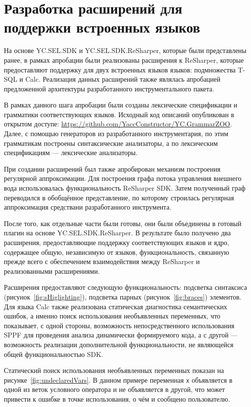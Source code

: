\section{Разработка расширений для поддержки встроенных языков}

На основе YC.SEL.SDK и YC.SEL.SDK.ReSharper, которые были представлены ранее, в рамках апробации были реализованы расширения к ReSharper, которые предоставляют поддержку для  двух встроенных языков языков: подмножества T-SQL и Calc. Реализация данных расширений также являлась апробацией предложенной архитектуры разработанного инструментального пакета.

В рамках данного шага апробации были созданы лексические спецификации и грамматики соответствующих языков. Исходный код описаний опубликован в открытом доступе: \url{https://github.com/YaccConstructor/YC.GrammarZOO}. Далее, с помощью генераторов из разработанного инструментария, по этим грамматикам построены синтаксические анализаторы, а по лексическим спецификациям --- лексические анализаторы.

При создании расширений был также апробирован механизм построения регулярной аппроксимации. Для построения графа потока управления внешнего вода использовалась функциональность ReSharper SDK. Затем полученный граф переводился в обобщённое представление, по которому строилась регулярная аппроксимация средствани разработанного инструмента.

После того, как отдельные части были готовы, они были объединены в готовый плагин на основе YC.SEL.SDK.ReSharper. В результате было получено два расширения, предоставляющие поддержку соответствующих языков и ядро, содержащее общую, независимую от языков, функциональность, связанную прежде всего с обеспечением взаимодействия между ReSharper и реализованными расширениями.

Расширения предоставляют следующую функциональность: подсветка синтаксиса (рисунок~\ref{fig:sHiglighting}), подсветка парных (рисунок~\ref{fig:braces}) элементов. Для языка Calc также реализована статическая диагностика семантических ошибок, а именно поиск использования необъявленных переменных, что показывает, с одной стороны, возможность непосредственного использования SPPF для проведения анализа динамически формируемого кода, а с другой --- возможность реализации дополнительной функциональности, не являющейся общей функциональностью SDK.

Статический поиск использования необъявленных переменных показан на 
рисунке~\ref{fig:undeclaredVars}. В данном примере переменная \verb|x| объявляется в одной из веток условного оператора и не объявляется в другой, что может привести к ошибке в точке использования, о чём и сообщено пользователю.

